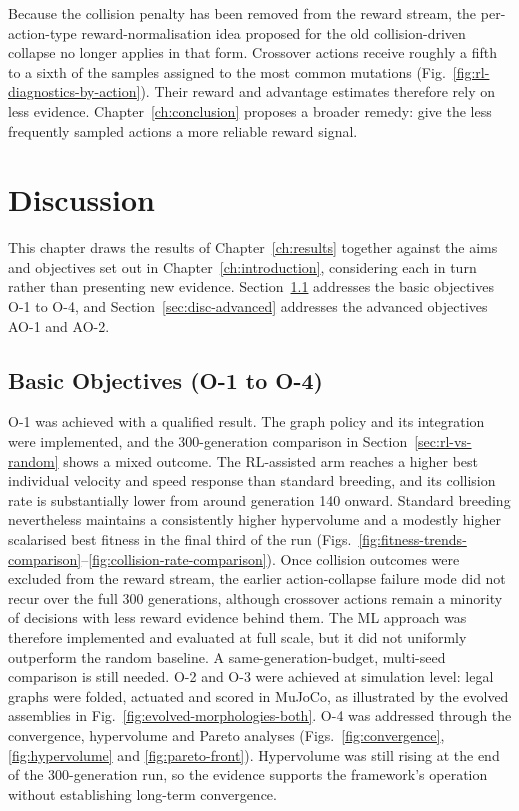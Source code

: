 \documentclass[12pt,a4paper]{report}
\begin{document}
Because the collision penalty has been removed from the reward stream, the per-action-type reward-normalisation idea proposed for the old collision-driven collapse no longer applies in that form. Crossover actions receive roughly a fifth to a sixth of the samples assigned to the most common mutations (Fig.~\ref{fig:rl-diagnostics-by-action}). Their reward and advantage estimates therefore rely on less evidence. Chapter~\ref{ch:conclusion} proposes a broader remedy: give the less frequently sampled actions a more reliable reward signal.


\chapter{Discussion}
\label{ch:discussion}
This chapter draws the results of Chapter~\ref{ch:results} together against the aims and objectives set out in Chapter~\ref{ch:introduction}, considering each in turn rather than presenting new evidence. Section~\ref{sec:disc-basic} addresses the basic objectives O-1 to O-4, and Section~\ref{sec:disc-advanced} addresses the advanced objectives AO-1 and AO-2.

\section{Basic Objectives (O-1 to O-4)}
\label{sec:disc-basic}
O-1 was achieved with a qualified result. The graph policy and its integration were implemented, and the 300-generation comparison in Section~\ref{sec:rl-vs-random} shows a mixed outcome. The RL-assisted arm reaches a higher best individual velocity and speed response than standard breeding, and its collision rate is substantially lower from around generation 140 onward. Standard breeding nevertheless maintains a consistently higher hypervolume and a modestly higher scalarised best fitness in the final third of the run (Figs.~\ref{fig:fitness-trends-comparison}--\ref{fig:collision-rate-comparison}). Once collision outcomes were excluded from the reward stream, the earlier action-collapse failure mode did not recur over the full 300 generations, although crossover actions remain a minority of decisions with less reward evidence behind them. The ML approach was therefore implemented and evaluated at full scale, but it did not uniformly outperform the random baseline. A same-generation-budget, multi-seed comparison is still needed. O-2 and O-3 were achieved at simulation level: legal graphs were folded, actuated and scored in MuJoCo, as illustrated by the evolved assemblies in Fig.~\ref{fig:evolved-morphologies-both}. O-4 was addressed through the convergence, hypervolume and Pareto analyses (Figs.~\ref{fig:convergence}, \ref{fig:hypervolume} and \ref{fig:pareto-front}). Hypervolume was still rising at the end of the 300-generation run, so the evidence supports the framework's operation without establishing long-term convergence.
\end{document}
